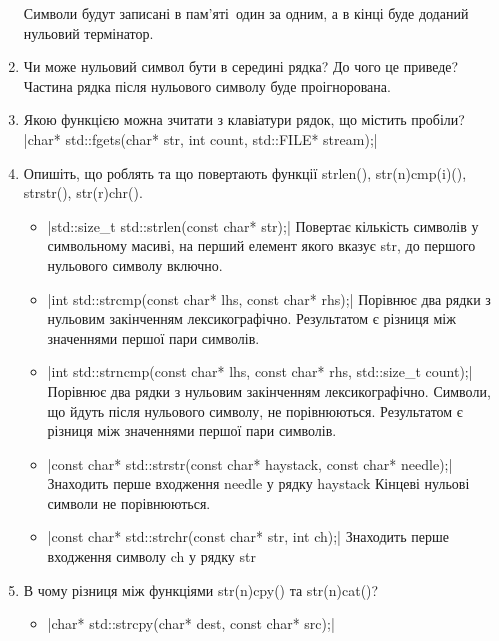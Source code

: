 \begin{enumerate}
            Символи будут записані в пам'яті один за одним,
            а в кінці буде доданий нульовий термінатор.
      \item Чи може нульовий символ бути в середині рядка? До чого це приведе? \\
            Частина рядка після нульового символу буде проігнорована.
      \item Якою функцією можна зчитати з клавіатури рядок, що містить пробіли?
            |char* std::fgets(char* str, int count, std::FILE* stream);|
      \item Опишіть, що роблять та що повертають функції strlen(), str(n)cmp(i)(), strstr(), str(r)chr().
            \begin{itemize}
                  \item {}|std::size_t std::strlen(const char* str);|
                        Повертає кількість символів у символьному масиві,
                        на перший елемент якого вказує str,
                        до першого нульового символу включно.
                  \item {}|int std::strcmp(const char* lhs, const char* rhs);|
                        Порівнює два рядки з нульовим закінченням лексикографічно.
                        Результатом є різниця між значеннями першої пари символів.
                  \item {}|int std::strncmp(const char* lhs, const char* rhs, std::size_t count);|
                        Порівнює два рядки з нульовим закінченням лексикографічно.
                        Символи, що йдуть після нульового символу, не порівнюються.
                        Результатом є різниця між значеннями першої пари символів.
                  \item {}|const char* std::strstr(const char* haystack, const char* needle);|
                        Знаходить перше входження needle у рядку haystack
                        Кінцеві нульові символи не порівнюються.
                  \item {}|const char* std::strchr(const char* str, int ch);|
                        Знаходить перше входження символу ch у рядку str
            \end{itemize}
      \item В чому різниця між функціями str(n)cpy() та str(n)cat()?
            \begin{itemize}
                  \item {}|char* std::strcpy(char* dest, const char* src);|

\end{itemize}
\end{enumerate}
